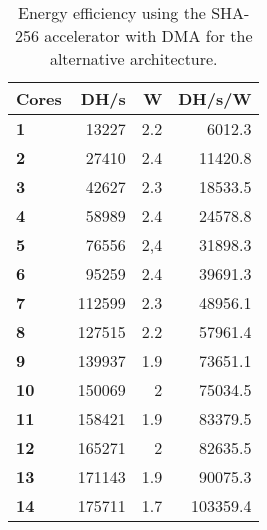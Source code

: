 \begin{appendix}
\begin{table}
\centering
\begin{tabular}{| l | r | r || r |}
  \hline 
  \textbf{Cores} & \textbf{DH/s} & \textbf{W} & \textbf{DH/s/W} \\
  \hline                       
  \textbf{1} & 13227 & 2.2 & 6012.3\\
  \textbf{2} & 27410 & 2.4 & 11420.8\\
  \textbf{3} & 42627 & 2.3 & 18533.5\\
  \textbf{4} & 58989 & 2.4 & 24578.8\\
  \textbf{5} & 76556 & 2,4 & 31898.3\\
  \textbf{6} & 95259 & 2.4 & 39691.3\\
  \textbf{7} & 112599 & 2.3 & 48956.1\\
  \textbf{8} & 127515 & 2.2 & 57961.4\\
  \textbf{9} & 139937 & 1.9 & 73651.1\\
  \textbf{10} & 150069 & 2 & 75034.5\\
  \textbf{11} & 158421 & 1.9 & 83379.5\\
  \textbf{12} & 165271 & 2 & 82635.5\\
  \textbf{13} & 171143 & 1.9 & 90075.3\\
  \textbf{14} & 175711 & 1.7 & 103359.4\\
  \hline 
\end{tabular}
\caption{Energy efficiency using the SHA-256 accelerator with DMA for the alternative architecture.}
\label{tab:SHADMA-eff2}
\end{table}

%
%
%

\end{appendix}

